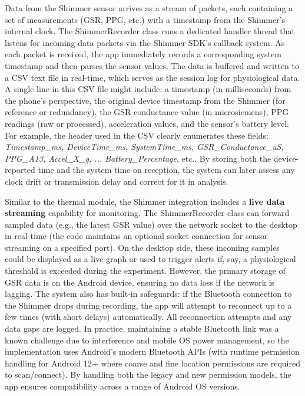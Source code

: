 \documentclass[11pt,a4paper]{report}
\begin{document}
Data from the Shimmer sensor arrives as a stream of packets, each
containing a set of measurements (GSR, PPG, etc.) with a timestamp from
the Shimmer's internal clock. The ShimmerRecorder class runs a dedicated
handler thread that listens for incoming data packets via the Shimmer
SDK's callback
system\cite{ElectrodermalActivityWiki}\cite{ElectrodermalActivityWiki}.
As each packet is received, the app immediately records a corresponding
system timestamp and then parses the sensor values. The data is buffered
and written to a CSV text file in real-time, which serves as the session
log for physiological data. A single line in this CSV file might
include: a timestamp (in milliseconds) from the phone's perspective, the
original device timestamp from the Shimmer (for reference or
redundancy), the GSR conductance value (in microsiemens), PPG readings
(raw or processed), acceleration values, and the sensor's battery
level\cite{ElectrodermalActivityWiki}.
For example, the header used in the CSV clearly enumerates these fields:
\textit{Timestamp\_ms, DeviceTime\_ms, SystemTime\_ms, GSR\_Conductance\_uS,
PPG\_A13, Accel\_X\_g, ... Battery\_Percentage},
etc.\cite{ElectrodermalActivityWiki}.
By storing both the device-reported time and the system time on
reception, the system can later assess any clock drift or transmission
delay and correct for it in analysis.

Similar to the thermal module, the Shimmer integration includes a \textbf{live
data streaming} capability for monitoring. The ShimmerRecorder class can
forward sampled data (e.g., the latest GSR value) over the network
socket to the desktop in real-time (the code maintains an optional
socket connection for sensor streaming on a specified
port)\cite{ElectrodermalActivityWiki}\cite{ContactlessStressThermal2022}.
On the desktop side, these incoming samples could be displayed as a live
graph or used to trigger alerts if, say, a physiological threshold is
exceeded during the experiment. However, the primary storage of GSR data
is on the Android device, ensuring no data loss if the network is
lagging. The system also has built-in safeguards: if the Bluetooth
connection to the Shimmer drops during recording, the app will attempt
to reconnect up to a few times (with short delays)
automatically\cite{ContactlessStressThermal2022}.
All reconnection attempts and any data gaps are logged. In practice,
maintaining a stable Bluetooth link was a known challenge due to
interference and mobile OS power management, so the implementation uses
Android's modern Bluetooth APIs (with runtime permission handling for
Android 12+ where coarse and fine location permissions are required to
scan/connect)\cite{DriverStressThermal2020}\cite{DriverStressThermal2020}.
By handling both the legacy and new permission models, the app ensures
compatibility across a range of Android OS versions.
\end{document}
